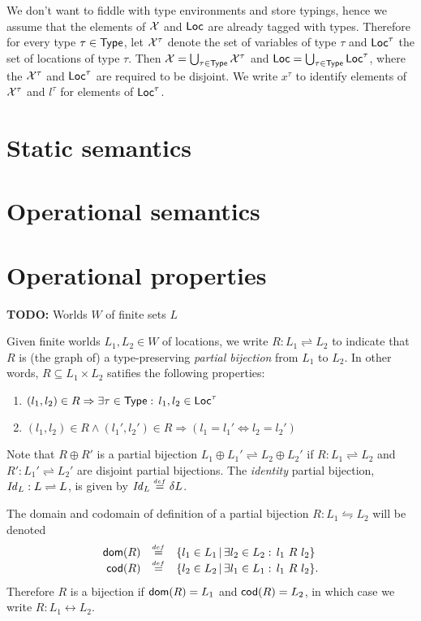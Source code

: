 \documentclass[12pt,a4paper]{article}
\begin{document}
We don't want to fiddle with type environments and store typings, hence we assume that
the elements of $\mathcal{X}$ and $\mathsf{Loc}$ are already tagged with types. Therefore for every
type $\tau\in\mathsf{Type}$, let $\mathcal{X}^\tau$ denote the set of variables of type $\tau$ and $\mathsf{Loc}^\tau$ the
set of locations of type $\tau$. Then $\mathcal{X}=\bigcup_{\tau\in\mathsf{Type}}\mathcal{X}^\tau$ and
$\mathsf{Loc}=\bigcup_{\tau\in\mathsf{Type}}\mathsf{Loc}^\tau$, where the $\mathcal{X}^\tau$ and $\mathsf{Loc}^\tau$ are
required to be disjoint. We write $x^\tau$ to identify elements of $\mathcal{X}^\tau$ and
$l^\tau$ for elements of $\mathsf{Loc}^\tau$.



\section{Static semantics}



\section{Operational semantics}



\section{Operational properties}

{\bf TODO:} Worlds $W$ of finite sets $L$

Given finite worlds $L_1,L_2 \in W$ of locations, we write $R: L_1 \rightleftharpoons L_2$ to
indicate that $R$ is (the graph of) a type-preserving {\em partial bijection} from $L_1$ to $L_2$.
In other words, $R \subseteq L_1 \times L_2$ satifies the following properties:
\begin{enumerate}
\item $(l_1,l_2)\in R \Rightarrow \exists \tau\in\mathsf{Type}:\,l_1,l_2\in\mathsf{Loc}^\tau$
\item $(l_1,l_2) \in R \wedge (l_1',l_2')\in R \Rightarrow (l_1=l_1' \Leftrightarrow l_2=l_2')$
\end{enumerate}
Note that $R \oplus R'$ is a partial bijection $L_1 \oplus L_1' \rightleftharpoons L_2 \oplus L_2'$
if $R: L_1 \rightleftharpoons L_2$ and $R': L_1' \rightleftharpoons L_2'$ are disjoint partial
bijections. The {\em identity} partial bijection, $\mathit{Id}_L: L \rightleftharpoons L$, is given by
$\mathit{Id}_L \stackrel{_{def}}{=} \delta L$.

The domain and codomain of definition of a partial bijection $R: L_1 \leftrightharpoons L_2$ will
be denoted
\[\begin{array}{rcl}
  \mathsf{dom}(R) &\stackrel{_{def}}{=}& \{ l_1 \in L_1\,|\, \exists l_2\in L_2:\,l_1\ R\ l_2\} \\
  \mathsf{cod}(R) &\stackrel{_{def}}{=}& \{ l_2 \in L_2\,|\, \exists l_1\in L_1:\,l_1\ R\ l_2\} .
\end{array}\]
Therefore $R$ is a bijection if $\mathsf{dom}(R) = L_1$ and $\mathsf{cod}(R) = L_2$, in which case we
write $R: L_1 \leftrightarrow L_2$.
\end{document}
